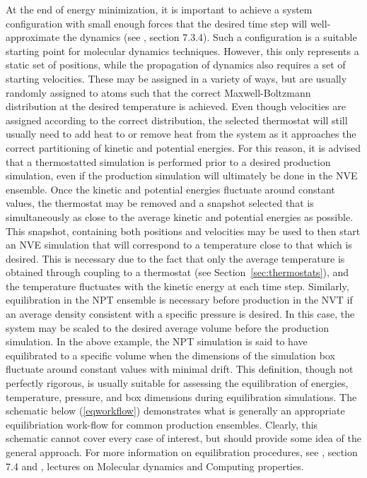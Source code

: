 \documentclass[9pt,bestpractices]{livecoms}
\begin{document}
At the end of energy minimization, it is important to achieve a system configuration with small enough forces that the desired time step will well-approximate the dynamics (see \citet{2001Leach}, section 7.3.4).
Such a configuration is a suitable starting point for molecular dynamics techniques.
However, this only represents a static set of positions, while the propagation of dynamics also requires a set of starting velocities.
These may be assigned in a variety of ways, but are usually randomly assigned to atoms such that the correct Maxwell-Boltzmann distribution at the desired temperature is achieved.
Even though velocities are assigned according to the correct distribution, the selected thermostat will still usually need to add heat to or remove heat from the system as it approaches the correct partitioning of kinetic and potential energies.
For this reason, it is advised that a thermostatted simulation is performed prior to a desired production simulation, even if the production simulation will ultimately be done in the NVE ensemble.
Once the kinetic and potential energies fluctuate around constant values, the thermostat may be removed and a snapshot selected that is simultaneously as close to the average kinetic and potential energies as possible.
This snapshot, containing both positions and velocities may be used to then start an NVE simulation that will correspond to a temperature close to that which is desired.
This is necessary due to the fact that only the average temperature is obtained through coupling to a thermostat (see Section~\ref{sec:thermostats}), and the temperature fluctuates with the kinetic energy at each time step.
Similarly, equilibration in the NPT ensemble is necessary before production in the NVT if an average density consistent with a specific pressure is desired.
In this case, the system may be scaled to the desired average volume before the production simulation.
In the above example, the NPT simulation is said to have equilibrated to a specific volume when the dimensions of the simulation box fluctuate around constant values with minimal drift. 
This definition, though not perfectly rigorous, is usually suitable for assessing the equilibration of energies, temperature, pressure, and box dimensions during equilibration simulations.
The schematic below (\ref{eqworkflow}) demonstrates what is generally an appropriate equilibriation work-flow for common production ensembles.
Clearly, this schematic cannot cover every case of interest, but should provide some idea of the general approach.
For more information on equilibration procedures, see \citet{2001Leach}, section 7.4 and \citet{ShellNotes}, lectures on Molecular dynamics and Computing properties.
\end{document}
